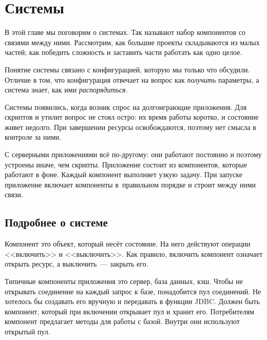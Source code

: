 \chapter{Системы}

\label{chapter-systems}


\begin{teaser}
В этой главе мы поговорим о системах. Так называют набор компонентов со связями
между ними. Рассмотрим, как большие проекты складываются из малых частей; как
победить сложность и заставить части работать как одно целое.
\end{teaser}

Понятие системы связано с конфигурацией, которую мы только что обсудили. Отличие
в том, что конфигурация отвечает на вопрос как \emph{получить} параметры, а
система знает, как ими \emph{распорядиться}.

Системы появились, когда возник спрос на долгоиграющие приложения. Для скриптов
и утилит вопрос не стоял остро: их время работы коротко, и состояние живет
недолго. При завершении ресурсы освобождаются, поэтому нет смысла в контроле за
ними.

С серверными приложениями всё по-другому: они работают постоянно и поэтому
устроены иначе, чем скрипты. Приложение состоит из компонентов, которые работают
в фоне. Каждый компонент выполняет узкую задачу. При запуске приложение включает
компоненты в~правильном порядке и строит между ними связи.

\section{Подробнее о системе}


Компонент это объект, который несёт состояние. На него действуют операции
<<включить>> и <<выключить>>. Как правило, включить компонент означает открыть
ресурс, а выключить~--- закрыть его.


Типичные компоненты приложения это сервер, база данных, кэш. Чтобы не открывать
соединение на каждый запрос к базе, понадобится пул соединений. Не хотелось бы
создавать его вручную и передавать в функции JDBC. Должен быть компонент,
который при включении открывает пул и хранит его. Потребителям компонент
предлагает методы для работы с базой. Внутри они используют открытый пул.


